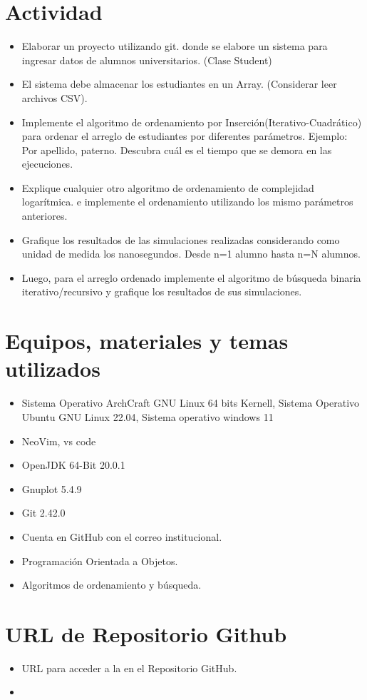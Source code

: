 	\section{Actividad}
	\begin{itemize}		
	  \item Elaborar un proyecto utilizando git. donde se elabore un sistema para ingresar datos de alumnos universitarios. (Clase Student)
	  \item El sistema debe almacenar los estudiantes en un Array. (Considerar leer archivos CSV).
	  \item Implemente el algoritmo de ordenamiento por Inserción(Iterativo-Cuadrático) para ordenar el arreglo de estudiantes por diferentes parámetros. Ejemplo: Por apellido, paterno. Descubra cuál es el tiempo que se demora en las ejecuciones.
	  \item Explique cualquier otro algoritmo de ordenamiento de complejidad logarítmica. e implemente el ordenamiento utilizando los mismo parámetros anteriores.
	  \item Grafique los resultados de las simulaciones realizadas considerando como unidad de medida los nanosegundos. Desde n=1 alumno hasta n=N alumnos.
	  \item Luego, para el arreglo ordenado implemente el algoritmo de búsqueda binaria iterativo/recursivo y grafique los resultados de sus simulaciones.
 

	\end{itemize}
		
	\section{Equipos, materiales y temas utilizados}
	\begin{itemize}
		\item Sistema Operativo ArchCraft GNU Linux 64 bits Kernell, Sistema Operativo Ubuntu GNU Linux 22.04, Sistema operativo windows 11
		\item NeoVim, vs code
		\item OpenJDK 64-Bit 20.0.1
		\item Gnuplot 5.4.9
		\item Git 2.42.0
		\item Cuenta en GitHub con el correo institucional.
		\item Programación Orientada a Objetos.
		\item Algoritmos de ordenamiento y búsqueda.
	\end{itemize}

	\section{URL de Repositorio Github}
	\begin{itemize}
            \item URL para acceder a la \itemPracticeNumber{} en el Repositorio GitHub.
            \item \itemUrl
	\end{itemize}





